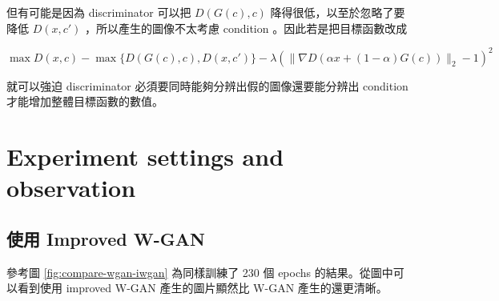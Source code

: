 \documentclass[fleqn,a4paper,12pt]{article}
\begin{document}
但有可能是因為 discriminator 可以把 $D(G(c), c)$ 降得很低，以至於忽略了要降低 $D(x, c')$ ，所以產生的圖像不太考慮 condition 。因此若是把目標函數改成

\begin{equation*}
  \max D(x, c) -\max\{D(G(c), c), D(x, c')\} - \lambda (\lVert \nabla D(\alpha x + (1 - \alpha) G(c)) \rVert_2 - 1)^2
\end{equation*}

就可以強迫 discriminator 必須要同時能夠分辨出假的圖像還要能分辨出 condition 才能增加整體目標函數的數值。

\section{Experiment settings and observation}

\subsection{使用 Improved W-GAN}

參考圖 \ref{fig:compare-wgan-iwgan} 為同樣訓練了 230 個 epochs 的結果。從圖中可以看到使用 improved W-GAN 產生的圖片顯然比 W-GAN 產生的還更清晰。
\end{document}
